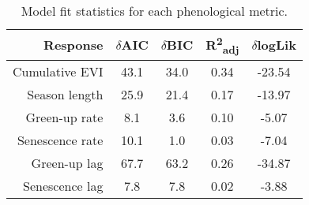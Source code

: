 \begin{table}[H]
\centering
\begin{tabular}{rcccc}
  \hline
Response & $\delta$AIC & $\delta$BIC & R\textsuperscript{2}\textsubscript{adj} & $\delta$logLik \\ 
  \hline
Cumulative EVI & 43.1 & 34.0 & 0.34 & -23.54 \\ 
  Season length & 25.9 & 21.4 & 0.17 & -13.97 \\ 
  Green-up rate & 8.1 & 3.6 & 0.10 & -5.07 \\ 
  Senescence rate & 10.1 & 1.0 & 0.03 & -7.04 \\ 
  Green-up lag & 67.7 & 63.2 & 0.26 & -34.87 \\ 
  Senescence lag & 7.8 & 7.8 & 0.02 & -3.88 \\ 
   \hline
\end{tabular}
\caption{Model fit statistics for each phenological metric.} 
\label{mod_stat}
\end{table}

